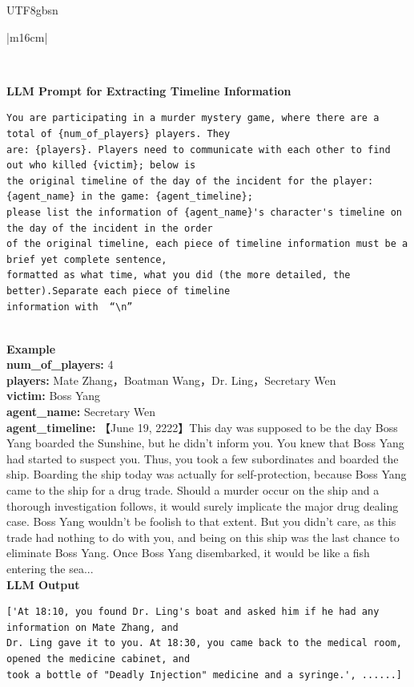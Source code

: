 \documentclass[11pt]{article}
\begin{document}
{\begin{CJK}{UTF8}{gbsn}
\begin{table}[ht!]
\begin{minipage}[t]{\linewidth}
\begin{tabular}{|m{16cm}|}
\begin{minipage}[t]{\linewidth}
\begin{verbatim}
\end{verbatim}
\end{minipage} \\

\hline
{}  {\textbf{LLM Prompt for Extracting Timeline Information}} \\
\begin{minipage}[t]{\linewidth}
\small\begin{verbatim}
You are participating in a murder mystery game, where there are a total of {num_of_players} players. They 
are: {players}. Players need to communicate with each other to find out who killed {victim}; below is
the original timeline of the day of the incident for the player: {agent_name} in the game: {agent_timeline};
please list the information of {agent_name}'s character's timeline on the day of the incident in the order
of the original timeline, each piece of timeline information must be a brief yet complete sentence, 
formatted as what time, what you did (the more detailed, the better).Separate each piece of timeline 
information with  “\n”

\end{verbatim}
\end{minipage} \\
\hline
{}  \textbf{Example}  \\
 \textbf{  num\_of\_players:} \small4\\
 \textbf{  players:} \small Mate Zhang，Boatman Wang，Dr. Ling，Secretary Wen\\
  \textbf{  victim:} \small Boss Yang\\
 \textbf{  agent\_name:} \small Secretary Wen\\
  \textbf{  agent\_timeline:} \small【June 19, 2222】This day was supposed to be the day Boss Yang boarded the Sunshine, but he didn't inform you. You knew that Boss Yang had started to suspect you. Thus, you took a few subordinates and boarded the ship. Boarding the ship today was actually for self-protection, because Boss Yang came to the ship for a drug trade. Should a murder occur on the ship and a thorough investigation follows, it would surely implicate the major drug dealing case. Boss Yang wouldn't be foolish to that extent. But you didn't care, as this trade had nothing to do with you, and being on this ship was the last chance to eliminate Boss Yang. Once Boss Yang disembarked, it would be like a fish entering the sea...  \\


\hline
{}  {\textbf{LLM Output}} \\
 \begin{minipage}[t]{\linewidth}
\small\begin{verbatim}
['At 18:10, you found Dr. Ling's boat and asked him if he had any information on Mate Zhang, and
Dr. Ling gave it to you. At 18:30, you came back to the medical room, opened the medicine cabinet, and
took a bottle of "Deadly Injection" medicine and a syringe.', ......]


\end{verbatim}
\end{minipage}
\end{tabular}
\end{minipage}
\end{table}
\end{CJK}}
\end{document}
